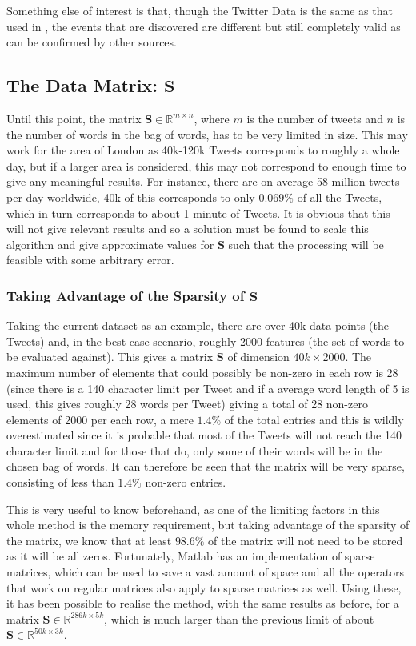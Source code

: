 \documentclass[11pt,a4paper]{article}
\newcommand{\smat}{\mathbf{S}}
\begin{document}
Something else of interest is that, though the Twitter Data is the same as that used in \cite{microblogs}, the events that are discovered are different but still completely valid as can be confirmed by other sources.

\subsection{The Data Matrix: $\smat$}
Until this point, the matrix $\mathbf{S} \in \mathbb{R}^{m \times n}$, where $m$ is the number of tweets and $n$ is the number of words in the bag of words, has to be very limited in size. This may work for the area of London as 40k-120k Tweets corresponds to roughly a whole day, but if a larger area is considered, this may not correspond to enough time to give any meaningful results. For instance,  there are on average 58 million tweets per day worldwide,\cite{statbrain} 40k of this corresponds to only $0.069\%$ of all the Tweets, which in turn corresponds to about 1 minute of Tweets. It is obvious that this will not give relevant results and so a solution must be found to scale this algorithm and give approximate values for $\mathbf{S}$ such that the processing will be feasible with some arbitrary error. 

\subsubsection{Taking Advantage of the Sparsity of $\mathbf{S}$}
\label{sparsity_matrix}

Taking the current dataset as an example, there are over 40k data points (the Tweets) and, in the best case scenario, roughly 2000 features (the set of words to be evaluated against). This gives a matrix $\mathbf{S}$ of dimension $40k\times 2000$. 
The maximum number of elements that could possibly be non-zero in each row is 28 (since there is a 140 character limit per Tweet and if a average word length of 5 is used, this gives roughly 28 words per Tweet) giving a total of 28 non-zero elements of 2000 per each row, a mere $1.4\%$ of the total entries and this is wildly overestimated since it is probable that most of the Tweets will not reach the 140 character limit and for those that do, only some of their words will be in the chosen bag of words. It can therefore be seen that the matrix will be very sparse, consisting of less than $1.4\%$ non-zero entries.

This is very useful to know beforehand, as one of the limiting factors in this whole method is the memory requirement, but taking advantage of the sparsity of the matrix, we know that at least $98.6\%$ of the matrix will not need to be stored as it will be all zeros. Fortunately, Matlab has an implementation of sparse matrices, which can be used to save a vast amount of space and all the operators that work on regular matrices also apply to sparse matrices as well. Using these, it has been possible to realise the method, with the same results as before, for a matrix $\mathbf{S} \in \mathbb{R}^{286k\times5k}$, which is much larger than the previous limit of about $\mathbf{S} \in \mathbb{R}^{50k\times3k}$.
\end{document}
